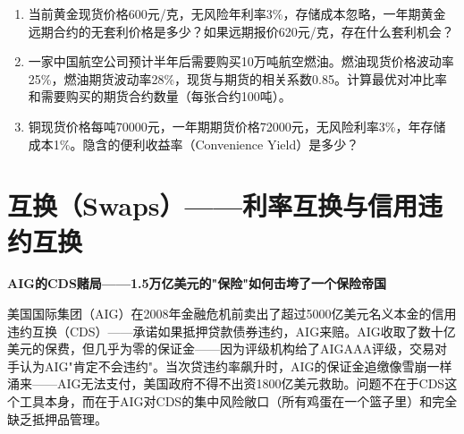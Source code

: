 \documentclass[a4paper,11pt]{ctexbook}
\begin{document}
\begin{exercises}
\begin{enumerate}
  \item 当前黄金现货价格600元/克，无风险年利率3\%，存储成本忽略，一年期黄金远期合约的无套利价格是多少？如果远期报价620元/克，存在什么套利机会？
  \item 一家中国航空公司预计半年后需要购买10万吨航空燃油。燃油现货价格波动率25\%，燃油期货波动率28\%，现货与期货的相关系数0.85。计算最优对冲比率和需要购买的期货合约数量（每张合约100吨）。
  \item 铜现货价格每吨70000元，一年期期货价格72000元，无风险利率3\%，年存储成本1\%。隐含的便利收益率（Convenience Yield）是多少？
\end{enumerate}
\end{exercises}


\newpage
\chapter{互换（Swaps）——利率互换与信用违约互换}

\begin{scenario}
\textbf{AIG的CDS赌局——1.5万亿美元的"保险"如何击垮了一个保险帝国}

美国国际集团（AIG）在2008年金融危机前卖出了超过5000亿美元名义本金的信用违约互换（CDS）——承诺如果抵押贷款债券违约，AIG来赔。AIG收取了数十亿美元的保费，但几乎为零的保证金——因为评级机构给了AIGAAA评级，交易对手认为AIG"肯定不会违约"。当次贷违约率飙升时，AIG的保证金追缴像雪崩一样涌来——AIG无法支付，美国政府不得不出资1800亿美元救助。问题不在于CDS这个工具本身，而在于AIG对CDS的集中风险敞口（所有鸡蛋在一个篮子里）和完全缺乏抵押品管理。
\end{scenario}
\end{document}
